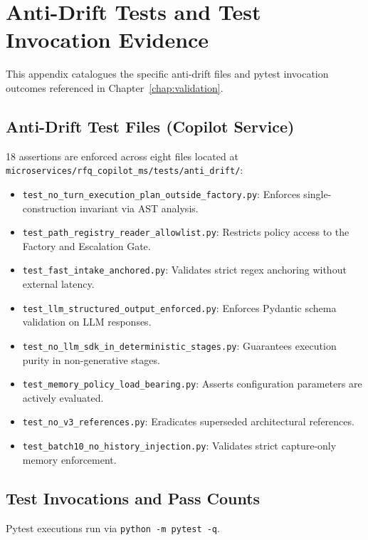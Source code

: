 \section{Anti-Drift Tests and Test Invocation Evidence}
\label{app:test-evidence}

This appendix catalogues the specific anti-drift files and pytest invocation outcomes referenced in Chapter~\ref{chap:validation}.

\subsection{Anti-Drift Test Files (Copilot Service)}
18 assertions are enforced across eight files located at \texttt{microservices/rfq\_copilot\_ms/tests/anti\_drift/}:
\begin{itemize}\setlength\itemsep{0.2em}
\item \texttt{test\_no\_turn\_execution\_plan\_outside\_factory.py}: Enforces single-construction invariant via AST analysis.
\item \texttt{test\_path\_registry\_reader\_allowlist.py}: Restricts policy access to the Factory and Escalation Gate.
\item \texttt{test\_fast\_intake\_anchored.py}: Validates strict regex anchoring without external latency.
\item \texttt{test\_llm\_structured\_output\_enforced.py}: Enforces Pydantic schema validation on LLM responses.
\item \texttt{test\_no\_llm\_sdk\_in\_deterministic\_stages.py}: Guarantees execution purity in non-generative stages.
\item \texttt{test\_memory\_policy\_load\_bearing.py}: Asserts configuration parameters are actively evaluated.
\item \texttt{test\_no\_v3\_references.py}: Eradicates superseded architectural references.
\item \texttt{test\_batch10\_no\_history\_injection.py}: Validates strict capture-only memory enforcement.
\end{itemize}

\subsection{Test Invocations and Pass Counts}
Pytest executions run via \texttt{python -m pytest -q}.

